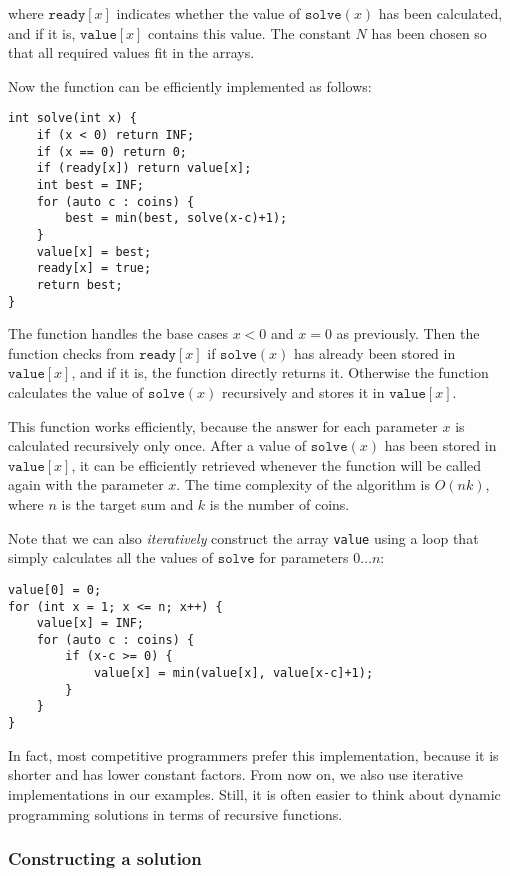 where $\texttt{ready}[x]$ indicates
whether the value of $\texttt{solve}(x)$ has been calculated,
and if it is, $\texttt{value}[x]$
contains this value.
The constant $N$ has been chosen so
that all required values fit in the arrays.

Now the function can be efficiently
implemented as follows:

\begin{lstlisting}
int solve(int x) {
    if (x < 0) return INF;
    if (x == 0) return 0;
    if (ready[x]) return value[x];
    int best = INF;
    for (auto c : coins) {
        best = min(best, solve(x-c)+1);
    }
    value[x] = best;
    ready[x] = true;
    return best;
}
\end{lstlisting}

The function handles the base cases
$x<0$ and $x=0$ as previously.
Then the function checks from
$\texttt{ready}[x]$ if
$\texttt{solve}(x)$ has already been stored
in $\texttt{value}[x]$,
and if it is, the function directly returns it.
Otherwise the function calculates the value
of $\texttt{solve}(x)$
recursively and stores it in $\texttt{value}[x]$.

This function works efficiently,
because the answer for each parameter $x$
is calculated recursively only once.
After a value of $\texttt{solve}(x)$ has been stored in $\texttt{value}[x]$,
it can be efficiently retrieved whenever the
function will be called again with the parameter $x$.
The time complexity of the algorithm is $O(nk)$,
where $n$ is the target sum and $k$ is the number of coins.

Note that we can also \emph{iteratively}
construct the array \texttt{value} using
a loop that simply calculates all the values
of $\texttt{solve}$ for parameters $0 \ldots n$:
\begin{lstlisting}
value[0] = 0;
for (int x = 1; x <= n; x++) {
    value[x] = INF;
    for (auto c : coins) {
        if (x-c >= 0) {
            value[x] = min(value[x], value[x-c]+1);
        }
    }
}
\end{lstlisting}

In fact, most competitive programmers prefer this
implementation, because it is shorter and has
lower constant factors.
From now on, we also use iterative implementations
in our examples.
Still, it is often easier to think about
dynamic programming solutions
in terms of recursive functions.


\subsubsection{Constructing a solution}

